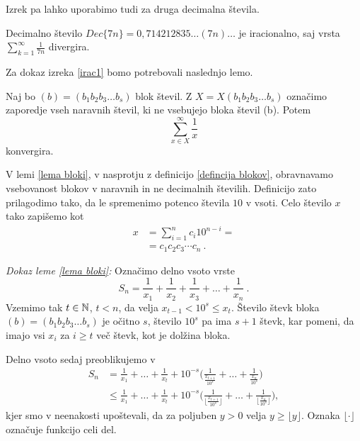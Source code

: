 \documentclass[twoside,11pt]{article}
\begin{document}
Izrek pa lahko uporabimo tudi za druga decimalna števila.

\begin{zgled}
    Decimalno število $Dec\{7n\} = 0,714212835\dots (7n) \dots$ je iracionalno, saj
    vrsta $\sum_{k=1}^{\infty}\frac{1}{7n} $ divergira.
\end{zgled}

Za dokaz izreka \ref{irac1} bomo potrebovali naslednjo lemo.

\begin{lema}\label{lema bloki}
    Naj bo $(b) = (b_1b_2b_3 \dots b_s)$ blok števil. Z $X = X(b_1b_2b_3 \dots b_s)$ označimo
    zaporedje vseh naravnih števil, ki ne vsebujejo bloka števil (b). Potem 
    \[ \sum_{x \in X}^{\infty} \frac{1}{x}\] konvergira.
\end{lema}

\begin{opomba}
    V lemi \ref{lema bloki}, v nasprotju z definicijo \ref{defincija blokov}, obravnavamo vsebovanost blokov v naravnih
    in ne decimalnih številih. Definicijo zato prilagodimo tako, da le spremenimo potenco števila
    $10$ v vsoti. Celo število $x$ tako zapišemo kot 
    \[ 
        \begin{split}
            x & = \sum^n_{i=1} c_i 10^{n-i} = \\
            & = c_1c_2c_3 \cdots c_n \ .
        \end{split} \]
\end{opomba}

\noindent
{\em Dokaz leme \ref{lema bloki}:\/} 
Označimo delno vsoto vrste 
\[ S_n = \frac{1}{x_1} + \frac{1}{x_2} + \frac{1}{x_3} + \dots + \frac{1}{x_n} \ . \]
Vzemimo tak $t \in \mathbb{N} $, $t < n$, da velja $x_{t-1} < 10^s \leq x_t$. Število števk bloka $(b) = (b_1b_2b_3 \dots b_s)$
je očitno $s$, število $10^s$ pa ima $s+1$ števk, kar pomeni, da imajo vsi $x_i$ za $i \geq t$
več števk, kot je dolžina bloka. 

Delno vsoto sedaj preoblikujemo v
\[ 
    \begin{split}
        S_n &= \frac{1}{x_1} + \dots + \frac{1}{x_t} + 10^{-s}\bigg(\frac{1}{\frac{x_{t + 1}}{10^s}} + \dots + \frac{1}{\frac{x_n}{10^s}}\bigg) \\
        &\leq \frac{1}{x_1} + \dots + \frac{1}{x_t} + 10^{-s}\bigg(\frac{1}{ \lfloor\frac{x_{t + 1}}{10^s}\rfloor} + \dots + \frac{1}{\lfloor\frac{x_n}{10^s}\rfloor}\bigg) ,
    \end{split}
     \]
kjer smo v neenakosti upoštevali, da za poljuben $y > 0$ velja $y \geq \lfloor y \rfloor$.
Oznaka $\lfloor \cdot \rfloor$ označuje funkcijo celi del.
\end{document}
